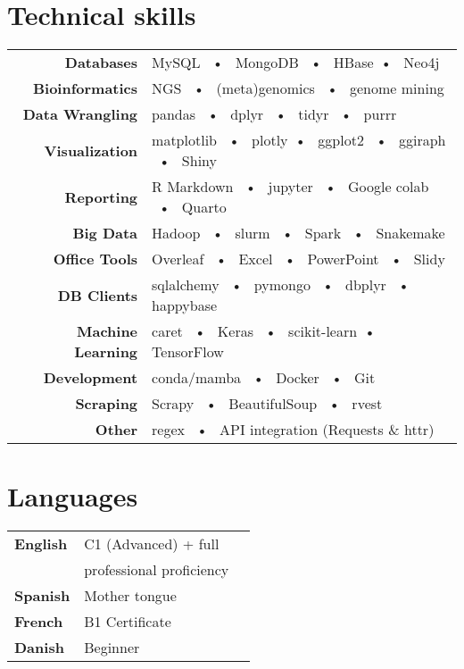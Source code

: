 \documentclass[verylight]{simplehipstercv}
\begin{document}
\begin{paracol}{2}
\section*{Technical skills}
\begin{tabular}{r|p{}}
   \textbf{Databases}           & MySQL ~•~ MongoDB ~•~ HBase~•~ Neo4j   \\
   \textbf{Bioinformatics}      & NGS ~•~ (meta)genomics ~•~ genome mining \\
   \textbf{Data Wrangling}      & pandas ~•~ dplyr ~•~ tidyr ~•~ purrr \\
   \textbf{Visualization}       & matplotlib ~•~ plotly~•~ ggplot2 ~•~ ggiraph ~•~ Shiny \\
   \textbf{Reporting}           & R Markdown ~•~ jupyter ~•~ Google colab ~•~ Quarto \\
   \textbf{Big Data}            & Hadoop ~•~ slurm ~•~ Spark ~•~ Snakemake \\
   \textbf{Office Tools}        & Overleaf ~•~ Excel ~•~ PowerPoint ~•~ Slidy \\
   \textbf{DB Clients}          & sqlalchemy ~•~ pymongo ~•~ dbplyr ~•~ happybase \\
   \textbf{Machine Learning}    & caret ~•~ Keras ~•~ scikit-learn~•~ TensorFlow \\
   \textbf{Development}         & conda/mamba ~•~ Docker ~•~ Git \\
   \textbf{Scraping}            & Scrapy ~•~ BeautifulSoup ~•~ rvest \\
   \textbf{Other}               & regex ~•~ API integration (Requests \& httr) \\ 
\end{tabular}

\vspace{2em}

\begin{minipage}[t]{0.3\textwidth}


\section*{Languages}
\begin{tabular}{l | ll}
\textbf{English} & C1 (Advanced) + full \\
&  professional proficiency \\
\textbf{Spanish} & {Mother tongue} \\
\textbf{French} & B1 Certificate \\
\textbf{Danish} & Beginner \\
\end{tabular}


\end{minipage}
\end{paracol}
\end{document}
